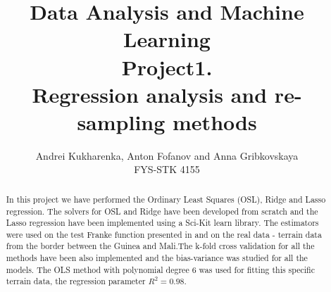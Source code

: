 \documentclass[10pt]{article}
\begin{document}
\setlength\parindent{1pt}
\title{Data Analysis and Machine Learning \\
Project1.\\ Regression analysis and re-sampling methods}
\author{Andrei Kukharenka, Anton Fofanov and Anna Gribkovskaya \\  
FYS-STK 4155 
}

\maketitle
\begin{abstract}
In this project we have performed the Ordinary Least Squares (OSL), Ridge and Lasso regression. The solvers for OSL and Ridge have been developed from scratch and the Lasso regression have been implemented using a Sci-Kit learn library. The estimators were used on the test Franke function presented in \cite{Franke} and on the real data - terrain data from the border between the Guinea and Mali.The k-fold cross validation for all the methods have been also implemented and the bias-variance was studied for all the models. The OLS method with polynomial degree $6$ was used for fitting  this specific terrain data, the regression parameter $R^2=0.98$.
\end{abstract}
\clearpage 
\end{document}
